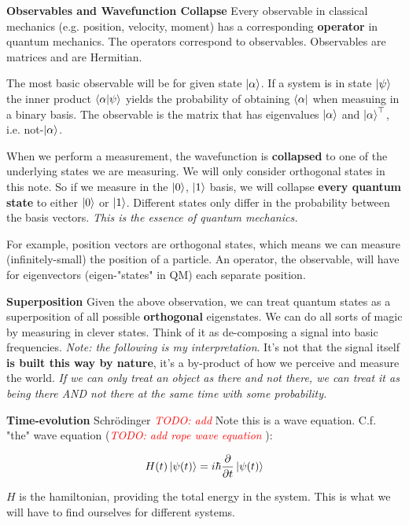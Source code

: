 \documentclass{article}
\newcommand{\comment}[1][]{#1} %
\newcommand{\todo}[1]{\comment{\textcolor{Red}{\textit{\lbrack TODO: #1 \rbrack}}}}
\begin{document}
\textbf{Observables and Wavefunction Collapse}
Every observable in classical mechanics (e.g. position, velocity, moment) has a corresponding \textbf{operator} in quantum mechanics. The operators correspond to observables. Observables are matrices and are Hermitian.
\vskip 0.15in

The most basic observable will be for given state $\ket{\alpha}$. If a system is in state $\ket{\psi}$ the inner product $\bra{\alpha}\ket{\psi}$ yields the probability of obtaining $\bra{\alpha}$ when measuing in a binary basis. The observable is the matrix that has eigenvalues $\ket{\alpha}$ and $\ket{\alpha}^\top$, i.e. not-$\ket{\alpha}$.

When we perform a measurement, the wavefunction is \textbf{collapsed} to one of the underlying states we are measuring. We will only consider orthogonal states in this note. So if we measure in the $\ket{0}$, $\ket{1}$ basis, we will collapse \textbf{every quantum state} to either $\ket{0}$ or $\ket{1}$. Different states only differ in the probability between the basis vectors. \textit{This is the essence of quantum mechanics.}

For example, position vectors are orthogonal states, which means we can measure (infinitely-small) the position of a particle. An operator, the observable, will have for eigenvectors (eigen-"states" in QM) each separate position.

\textbf{Superposition} Given the above observation, we can treat quantum states as a superposition of all possible \textbf{orthogonal} eigenstates. We can do all sorts of magic by measuring in clever states. Think of it as de-composing a signal into basic frequencies. \textit{Note: the following is my interpretation}. It's not that the signal itself \textbf{is built this way by nature}, it's a by-product of how we perceive and measure the world. \textit{If we can only treat an object as there and not there, we can treat it as being there AND not there at the same time with some probability.}

\textbf{Time-evolution} Schr{\"o}dinger \todo{add}
Note this is a wave equation. C.f. "the" wave equation (\todo{add rope wave equation}):

\begin{equation}
    H(t) \ket{\psi(t)} = i \hbar \frac{\partial}{\partial t} \ket{\psi(t)}
\end{equation}

$H$ is the hamiltonian, providing the total energy in the system. This is what we will have to find ourselves for different systems.
\end{document}
